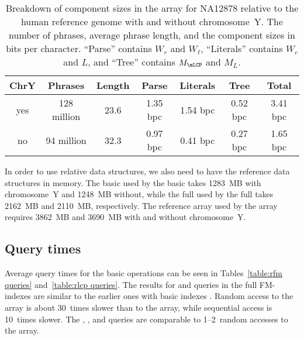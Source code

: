 \begin{table*}
\caption{Breakdown of component sizes in the \RLCP{} array for NA12878 relative
to the human reference genome with and without chromosome~Y. The number of phrases,
average phrase length, and the component sizes in bits per character. ``Parse''
contains $W_{r}$ and $W_{\ell}$, ``Literals'' contains $W_{c}$ and $L$, and ``Tree''
contains $M_{\mLCP}$ and $M_{L}$.}\label{table:rlcp components}
\setlength{\extrarowheight}{2pt}
\setlength{\tabcolsep}{3pt}
\begin{center}
\begin{tabular}{c|cc|ccc|c}
\hline
\textbf{ChrY} & \textbf{Phrases} & \textbf{Length} & \textbf{Parse} & \textbf{Literals} & \textbf{Tree} & \textbf{Total} \\
\hline
yes           &      128 million &            23.6 &      1.35 bpc &          1.54 bpc &      0.52 bpc &        3.41 bpc \\
no            &       94 million &            32.3 &      0.97 bpc &          0.41 bpc &      0.27 bpc &        1.65 bpc \\
\hline
\end{tabular}
\end{center}
\end{table*}

In order to use relative data structures, we also need to have the reference
data structures in memory. The basic \SSA{} used by the basic
\RFM{} takes 1283~MB with chromosome~Y and 1248~MB without, while the full
\SSA{} used by the full \RFM{} takes 2162~MB and 2110~MB, respectively. The
reference \LCP{} array used by the \RLCP{} array requires 3862~MB and 3690~MB
with and without chromosome~Y.


\subsection{Query times}

Average query times for the basic operations can be seen in Tables~\ref{table:rfm
queries} and~\ref{table:rlcp queries}. The results for \LF{} and \Psiop{} queries
in the full FM-indexes are similar to the earlier ones with basic indexes
\cite{Boucher2015}. Random access to the \RLCP{} array is about 30~times
slower than to the \LCP{} array, while sequential access is 10~times slower.
The \nsv, \psv, and \rmq{} queries are comparable to 1\nobreakdash--2~random
accesses to the \RLCP{} array.

